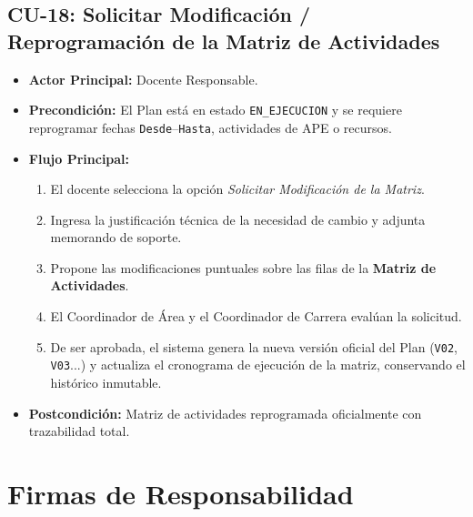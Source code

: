 \documentclass[12pt,a4paper]{article}
\begin{document}
\subsection{CU-18: Solicitar Modificación / Reprogramación de la Matriz de Actividades}
\begin{itemize}[leftmargin=1.5em, itemsep=2pt]
    \item \textbf{Actor Principal:} Docente Responsable.
    \item \textbf{Precondición:} El Plan está en estado \texttt{EN\_EJECUCION} y se requiere reprogramar fechas \texttt{Desde}--\texttt{Hasta}, actividades de APE o recursos.
    \item \textbf{Flujo Principal:}
    \begin{enumerate}[leftmargin=1.2em, itemsep=1.5pt]
        \item El docente selecciona la opción \textit{Solicitar Modificación de la Matriz}.
        \item Ingresa la justificación técnica de la necesidad de cambio y adjunta memorando de soporte.
        \item Propone las modificaciones puntuales sobre las filas de la \textbf{Matriz de Actividades}.
        \item El Coordinador de Área y el Coordinador de Carrera evalúan la solicitud.
        \item De ser aprobada, el sistema genera la nueva versión oficial del Plan (\texttt{V02}, \texttt{V03}...) y actualiza el cronograma de ejecución de la matriz, conservando el histórico inmutable.
    \end{enumerate}
    \item \textbf{Postcondición:} Matriz de actividades reprogramada oficialmente con trazabilidad total.
\end{itemize}

\vspace{0.3cm}

\section{Firmas de Responsabilidad}
\end{document}
